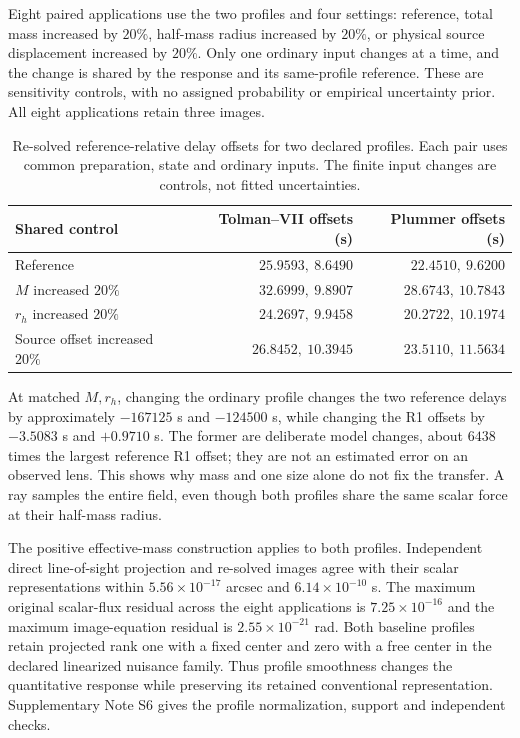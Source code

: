 Eight paired applications use the two profiles and four settings:
reference, total mass increased by $20\%$, half-mass radius increased
by $20\%$, or physical source displacement increased by $20\%$.
Only one ordinary input changes at a time, and the change is shared by
the response and its same-profile reference. These are sensitivity
controls, with no assigned probability or empirical uncertainty prior.
All eight applications retain three images.
\begin{table}[htbp]
 \centering
 \caption{Re-solved reference-relative delay offsets for two declared
 profiles. Each pair uses common preparation, state and ordinary inputs.
 The finite input changes are controls, not fitted uncertainties.}
 \label{tab:profile-robustness}
 \begin{tabular}{lrr}
 \toprule
 Shared control & Tolman--VII offsets (s) & Plummer offsets (s)\\
 \midrule
 Reference & $25.9593,\ 8.6490$ & $22.4510,\ 9.6200$\\
 $M$ increased $20\%$ & $32.6999,\ 9.8907$ & $28.6743,\ 10.7843$\\
 $r_h$ increased $20\%$ & $24.2697,\ 9.9458$ & $20.2722,\ 10.1974$\\
 Source offset increased $20\%$ & $26.8452,\ 10.3945$ & $23.5110,\ 11.5634$\\
 \bottomrule
 \end{tabular}
\end{table}

At matched $M,r_h$, changing the ordinary profile changes the two
reference delays by approximately $-167125$ s and $-124500$ s, while
changing the R1 offsets by $-3.5083$ s and $+0.9710$ s. The former
are deliberate model changes, about $6438$ times the largest reference
R1 offset; they are not an estimated error on an observed lens. This
shows why mass and one size alone do not fix the transfer. A ray samples
the entire field, even though both profiles share the same scalar force
at their half-mass radius.

The positive effective-mass construction applies to both profiles.
Independent direct line-of-sight projection and re-solved images agree
with their scalar representations within $5.56\times10^{-17}$ arcsec
and $6.14\times10^{-10}$ s. The maximum original scalar-flux residual
across the eight applications is $7.25\times10^{-16}$ and the maximum
image-equation residual is $2.55\times10^{-21}$ rad. Both baseline
profiles retain projected rank one with a fixed center and zero with a
free center in the declared linearized nuisance family. Thus profile
smoothness changes the quantitative response while preserving its
retained conventional representation. Supplementary Note S6 gives the
profile normalization, support and independent checks.

